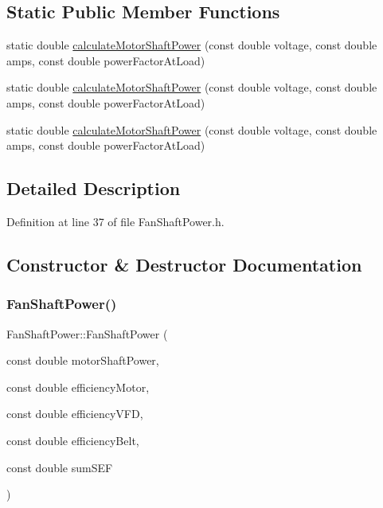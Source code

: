 \subsection*{Static Public Member Functions}
\begin{DoxyCompactItemize}
\item 
static double \hyperlink{class_fan_shaft_power_aa1928514508aed582dc9b11127b4546a}{calculate\+Motor\+Shaft\+Power} (const double voltage, const double amps, const double power\+Factor\+At\+Load)
\item 
static double \hyperlink{class_fan_shaft_power_aa1928514508aed582dc9b11127b4546a}{calculate\+Motor\+Shaft\+Power} (const double voltage, const double amps, const double power\+Factor\+At\+Load)
\item 
static double \hyperlink{class_fan_shaft_power_aa1928514508aed582dc9b11127b4546a}{calculate\+Motor\+Shaft\+Power} (const double voltage, const double amps, const double power\+Factor\+At\+Load)
\end{DoxyCompactItemize}


\subsection{Detailed Description}


Definition at line 37 of file Fan\+Shaft\+Power.\+h.



\subsection{Constructor \& Destructor Documentation}
\mbox{\label{class_fan_shaft_power_afe665bc2baf1a876d265ebc9129f70e2}} 
\subsubsection{\texorpdfstring{Fan\+Shaft\+Power()}{FanShaftPower()}\hspace{0.1cm}{\footnotesize\ttfamily [1/3]}}
{\footnotesize\ttfamily Fan\+Shaft\+Power\+::\+Fan\+Shaft\+Power (\begin{DoxyParamCaption}\item[{const double}]{motor\+Shaft\+Power,  }\item[{const double}]{efficiency\+Motor,  }\item[{const double}]{efficiency\+V\+FD,  }\item[{const double}]{efficiency\+Belt,  }\item[{const double}]{sum\+S\+EF }\end{DoxyParamCaption})\hspace{0.3cm}{\ttfamily [inline]}}



